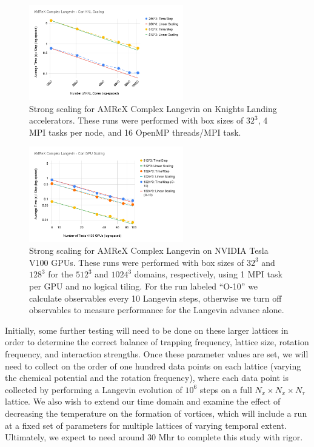 \documentclass[onecolumn, 12pt]{article}
\begin{document}
%
\begin{figure}[h]
\centering
\includegraphics[width=0.6\textwidth]{./AMReX_Complex_Langevin_Cori_KNL_Scaling.png}
\caption{\label{Fig:KNLScaling} Strong scaling for AMReX Complex Langevin on Knights Landing accelerators. These runs were performed with box sizes of $32^3$, 4 MPI tasks per node, and 16 OpenMP threads/MPI task.\vspace{-3mm}}
\end{figure}
%

%
\begin{figure}[h]
\centering
\includegraphics[width=0.6\textwidth]{./AMReX_Complex_Langevin_Cori_GPU_Scaling.png}
	\caption{\label{Fig:GPUScaling} Strong scaling for AMReX Complex Langevin on NVIDIA Tesla V100 GPUs. These runs were performed with box sizes of $32^3$ and $128^3$ for the $512^3$ and $1024^3$ domains, respectively, using 1 MPI task per GPU and no logical tiling. For the run labeled ``O-10'' we calculate observables every 10 Langevin steps, otherwise we turn off observables to measure performance for the Langevin advance alone.\vspace{-3mm}}
\end{figure}
%

Initially, some further testing will need to be done on these larger lattices in order to determine the correct balance of trapping frequency, lattice size, rotation frequency, and interaction strengths. Once these parameter values are set, we will need to collect on the order of one hundred data points on each lattice (varying the chemical potential and the rotation frequency), where each data point is collected by performing a Langevin evolution of $10^{6}$ steps on a full $N_{x} \times N_{x} \times N_{\tau}$ lattice. We also wish to extend our time domain and examine the effect of decreasing the temperature on the formation of vortices, which will include a run at a fixed set of parameters for multiple lattices of varying temporal extent. Ultimately, we expect to need around 30 Mhr to complete this study with rigor.

{}
%

\end{document}
